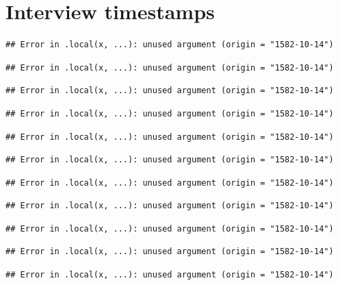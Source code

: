 \documentclass[
  11pt,
  a4paperpaper,
]{article}
\let\stdsection\section
\renewcommand{\section}{\FloatBarrier\clearpage\FloatBarrier\stdsection}
\begin{document}
\hypertarget{sec:timestamps}{%
\section{Interview timestamps}\label{sec:timestamps}}

\begin{verbatim}
## Error in .local(x, ...): unused argument (origin = "1582-10-14")
\end{verbatim}

\begin{verbatim}
## Error in .local(x, ...): unused argument (origin = "1582-10-14")
\end{verbatim}

\begin{verbatim}
## Error in .local(x, ...): unused argument (origin = "1582-10-14")
\end{verbatim}

\begin{verbatim}
## Error in .local(x, ...): unused argument (origin = "1582-10-14")
\end{verbatim}

\begin{verbatim}
## Error in .local(x, ...): unused argument (origin = "1582-10-14")
\end{verbatim}

\begin{verbatim}
## Error in .local(x, ...): unused argument (origin = "1582-10-14")
\end{verbatim}

\begin{verbatim}
## Error in .local(x, ...): unused argument (origin = "1582-10-14")
\end{verbatim}

\begin{verbatim}
## Error in .local(x, ...): unused argument (origin = "1582-10-14")
\end{verbatim}

\begin{verbatim}
## Error in .local(x, ...): unused argument (origin = "1582-10-14")
\end{verbatim}

\begin{verbatim}
## Error in .local(x, ...): unused argument (origin = "1582-10-14")
\end{verbatim}

\begin{verbatim}
## Error in .local(x, ...): unused argument (origin = "1582-10-14")
\end{verbatim}
\end{document}
